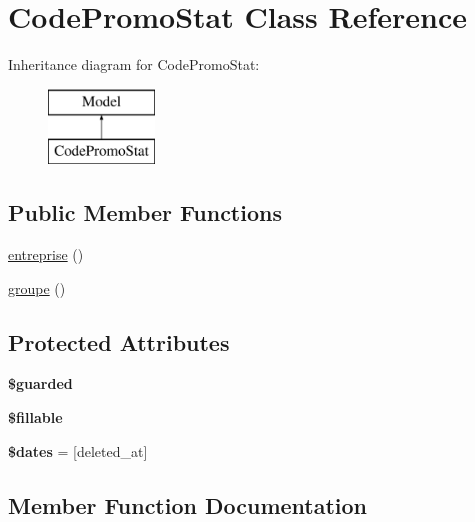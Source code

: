 \hypertarget{class_app_1_1_code_promo_stat}{}\section{Code\+Promo\+Stat Class Reference}
\label{class_app_1_1_code_promo_stat}
Inheritance diagram for Code\+Promo\+Stat\+:\begin{figure}[H]
\begin{center}
\leavevmode
\includegraphics[height=2.000000cm]{class_app_1_1_code_promo_stat}
\end{center}
\end{figure}
\subsection*{Public Member Functions}
\begin{DoxyCompactItemize}
\item 
\mbox{\hyperlink{class_app_1_1_code_promo_stat_ad51130e7e8195d53e3670bb41642cb14}{entreprise}} ()
\item 
\mbox{\hyperlink{class_app_1_1_code_promo_stat_a79c76730c746d2efc49be76ff916da1f}{groupe}} ()
\end{DoxyCompactItemize}
\subsection*{Protected Attributes}
\begin{DoxyCompactItemize}
\item 
{\bfseries \$guarded}
\item 
{\bfseries \$fillable}
\item 
\mbox{\label{class_app_1_1_code_promo_stat_aab581066837d6296ba35c72937b6fc1c}} 
{\bfseries \$dates} = \mbox{[}\textquotesingle{}deleted\+\_\+at\textquotesingle{}\mbox{]}
\end{DoxyCompactItemize}


\subsection{Member Function Documentation}
\mbox{\label{class_app_1_1_code_promo_stat_ad51130e7e8195d53e3670bb41642cb14}} 
